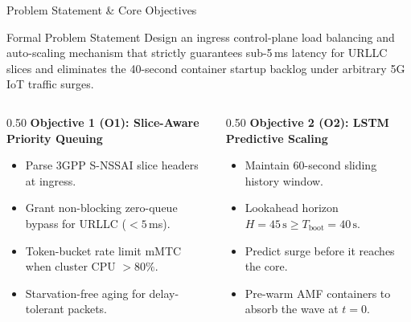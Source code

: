 \documentclass[aspectratio=169,10pt]{beamer}
\begin{document}
\begin{frame}{Problem Statement \& Core Objectives}
    \begin{block}{Formal Problem Statement}
        Design an ingress control-plane load balancing and auto-scaling mechanism that strictly guarantees sub-5\,ms latency for URLLC slices and eliminates the 40-second container startup backlog under arbitrary 5G IoT traffic surges.
    \end{block}

    \vspace{0.3cm}
    \begin{columns}[T]
        \begin{column}{0.50\textwidth}
            \textbf{Objective 1 (O1): Slice-Aware Priority Queuing}
            \begin{itemize}
                \item Parse 3GPP S-NSSAI slice headers at ingress.
                \item Grant non-blocking zero-queue bypass for URLLC ($< 5$\,ms).
                \item Token-bucket rate limit mMTC when cluster CPU $> 80\%$.
                \item Starvation-free aging for delay-tolerant packets.
            \end{itemize}
        \end{column}
        \begin{column}{0.50\textwidth}
            \textbf{Objective 2 (O2): LSTM Predictive Scaling}
            \begin{itemize}
                \item Maintain 60-second sliding history window.
                \item Lookahead horizon $H = 45\,\text{s} \ge T_{\text{boot}} = 40\,\text{s}$.
                \item Predict surge before it reaches the core.
                \item Pre-warm AMF containers to absorb the wave at $t = 0$.
            \end{itemize}
        \end{column}
    \end{columns}
\end{frame}
\end{document}
